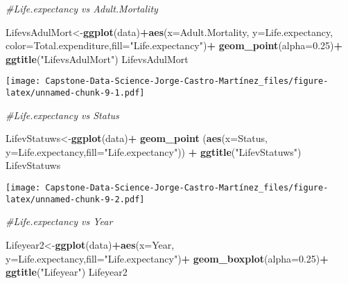 \documentclass[
]{article}
\newenvironment{Shaded}{\begin{snugshade}}{\end{snugshade}}
\newcommand{\AttributeTok}[1]{\textcolor[rgb]{0.13,0.29,0.53}{#1}}
\newcommand{\CommentTok}[1]{\textcolor[rgb]{0.56,0.35,0.01}{\textit{#1}}}
\newcommand{\FloatTok}[1]{\textcolor[rgb]{0.00,0.00,0.81}{#1}}
\newcommand{\FunctionTok}[1]{\textcolor[rgb]{0.13,0.29,0.53}{\textbf{#1}}}
\newcommand{\NormalTok}[1]{#1}
\newcommand{\OtherTok}[1]{\textcolor[rgb]{0.56,0.35,0.01}{#1}}
\newcommand{\SpecialCharTok}[1]{\textcolor[rgb]{0.81,0.36,0.00}{\textbf{#1}}}
\newcommand{\StringTok}[1]{\textcolor[rgb]{0.31,0.60,0.02}{#1}}
\begin{document}
\begin{Shaded}
\begin{Highlighting}[]
\CommentTok{\#Life.expectancy vs Adult.Mortality}

\NormalTok{LifevsAdulMort}\OtherTok{\textless{}{-}}\FunctionTok{ggplot}\NormalTok{(data)}\SpecialCharTok{+}\FunctionTok{aes}\NormalTok{(}\AttributeTok{x=}\NormalTok{Adult.Mortality, }\AttributeTok{y=}\NormalTok{Life.expectancy, }\AttributeTok{color=}\NormalTok{Total.expenditure,}\AttributeTok{fill=}\StringTok{"Life.expectancy"}\NormalTok{)}\SpecialCharTok{+}
  \FunctionTok{geom\_point}\NormalTok{(}\AttributeTok{alpha=}\FloatTok{0.25}\NormalTok{)}\SpecialCharTok{+}
  \FunctionTok{ggtitle}\NormalTok{(}\StringTok{"LifevsAdulMort"}\NormalTok{)}
\NormalTok{LifevsAdulMort}
\end{Highlighting}
\end{Shaded}

\texttt{[image: Capstone-Data-Science-Jorge-Castro-Martínez\_files/figure-latex/unnamed-chunk-9-1.pdf]}

\begin{Shaded}
\begin{Highlighting}[]
\CommentTok{\#Life.expectancy vs Status}

\NormalTok{LifevStatuws}\OtherTok{\textless{}{-}}\FunctionTok{ggplot}\NormalTok{(data)}\SpecialCharTok{+} \FunctionTok{geom\_point}\NormalTok{ (}\FunctionTok{aes}\NormalTok{(}\AttributeTok{x=}\NormalTok{Status, }\AttributeTok{y=}\NormalTok{Life.expectancy,}\AttributeTok{fill=}\StringTok{"Life.expectancy"}\NormalTok{)) }\SpecialCharTok{+}
  \FunctionTok{ggtitle}\NormalTok{(}\StringTok{"LifevStatuws"}\NormalTok{)}
\NormalTok{LifevStatuws}
\end{Highlighting}
\end{Shaded}

\texttt{[image: Capstone-Data-Science-Jorge-Castro-Martínez\_files/figure-latex/unnamed-chunk-9-2.pdf]}

\begin{Shaded}
\begin{Highlighting}[]
\CommentTok{\#Life.expectancy vs Year}

\NormalTok{Lifeyear2}\OtherTok{\textless{}{-}}\FunctionTok{ggplot}\NormalTok{(data)}\SpecialCharTok{+}\FunctionTok{aes}\NormalTok{(}\AttributeTok{x=}\NormalTok{Year, }\AttributeTok{y=}\NormalTok{Life.expectancy,}\AttributeTok{fill=}\StringTok{"Life.expectancy"}\NormalTok{)}\SpecialCharTok{+}
  \FunctionTok{geom\_boxplot}\NormalTok{(}\AttributeTok{alpha=}\FloatTok{0.25}\NormalTok{)}\SpecialCharTok{+}
  \FunctionTok{ggtitle}\NormalTok{(}\StringTok{"Lifeyear"}\NormalTok{)}
\NormalTok{Lifeyear2}
\end{Highlighting}
\end{Shaded}
\end{document}
